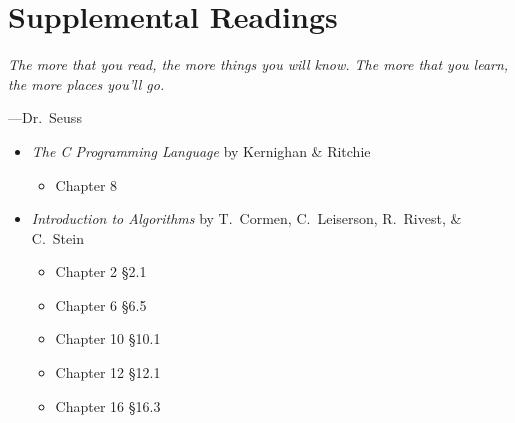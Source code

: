 \section{Supplemental Readings}

\epigraph{\emph{The more that you read, the more things you will know. The
more that you learn, the more places you'll go.}}{---Dr.\ Seuss}

\begin{itemize}
  \item \textit{The C Programming Language} by Kernighan \& Ritchie
  \begin{itemize}
    \item Chapter 8
  \end{itemize}
  \item \textit{Introduction to Algorithms} by T.\ Cormen, C.\
    Leiserson, R.\ Rivest, \& C.\ Stein
    \begin{itemize}
      \item Chapter 2 \S 2.1
      \item Chapter 6 \S 6.5
      \item Chapter 10 \S 10.1
      \item Chapter 12 \S 12.1
      \item Chapter 16 \S 16.3
    \end{itemize}
\end{itemize}
